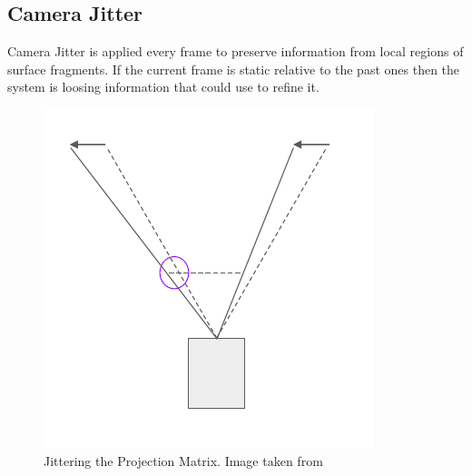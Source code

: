 \documentclass{acmsiggraph}               %
\begin{document}
\subsection{Camera Jitter}
Camera Jitter is applied every frame to preserve information from local regions of surface fragments. If the current frame is static relative to the past ones then the system is loosing information that could use to refine it. ~\cite{Fuglsand2016,XU2016}
\begin{figure}[H]
    \centering
    \includegraphics[scale=0.3]{Jitter.png}
    \caption{Jittering the Projection Matrix. Image taken from \protect\cite{Fuglsand2016}}
    \label{fig_Jitter}
\end{figure}
\end{document}
